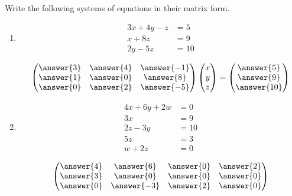 \documentclass{ximera}
\author{Parisa Fatheddin}
\begin{document}
\begin{exercise}

  Write the following systems of equations in their matrix form.

  \begin{enumerate}
  \item
    \begin{align*}
      3x+ 4y -z &= 5\\
      x + 8z &=9 \\
      2y -5z &= 10
    \end{align*}
    \begin{prompt}
      \begin{equation*}
        \begin{pmatrix}
          \answer{3} & \answer{4} & \answer{-1} \\
          \answer{1} & \answer{0} & \answer{8} \\
          \answer{0} & \answer{2} & \answer{-5}
        \end{pmatrix}
        \begin{pmatrix}
          x \\
          y \\
          z
        \end{pmatrix}
        =
        \begin{pmatrix}
          \answer{5}\\
          \answer{9}\\
          \answer{10}
        \end{pmatrix}
      \end{equation*}
    \end{prompt}
  \item
    \begin{align*}
      4x + 6y +2w &= 0\\
      3x &= 9\\
      2z -3y &= 10\\
      5z &= 3\\
      w + 2z &= 0
    \end{align*}
    \begin{prompt}
      \begin{equation*}
        \begin{pmatrix}
          \answer{4} & \answer{6} &\answer{0} & \answer{2}\\
          \answer{3} & \answer{0} &\answer{0} & \answer{0}\\
          \answer{0} & \answer{-3} &\answer{2} & \answer{0}\\

\end{pmatrix}
\end{equation*}
\end{prompt}
\end{enumerate}
\end{exercise}
\end{document}
